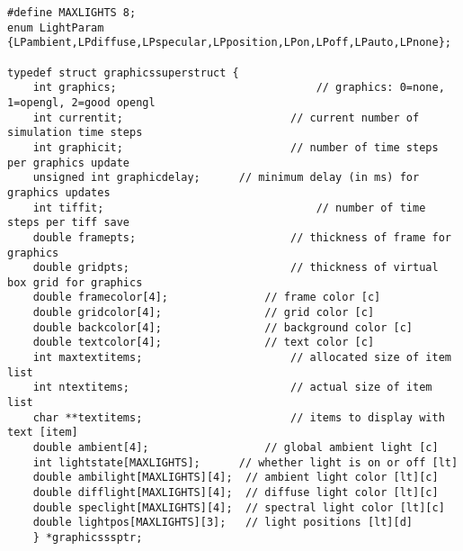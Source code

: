 \documentclass {book}
\begin{document}
\begin{lstlisting}
#define MAXLIGHTS 8;
enum LightParam {LPambient,LPdiffuse,LPspecular,LPposition,LPon,LPoff,LPauto,LPnone};

typedef struct graphicssuperstruct {
	int graphics;								// graphics: 0=none, 1=opengl, 2=good opengl
	int currentit;							// current number of simulation time steps
	int graphicit;							// number of time steps per graphics update
	unsigned int graphicdelay;		// minimum delay (in ms) for graphics updates
	int tiffit;									// number of time steps per tiff save
	double framepts;						// thickness of frame for graphics
	double gridpts;							// thickness of virtual box grid for graphics
	double framecolor[4];				// frame color [c]
	double gridcolor[4];				// grid color [c]
	double backcolor[4];				// background color [c]
	double textcolor[4];				// text color [c]
	int maxtextitems;						// allocated size of item list
	int ntextitems;							// actual size of item list
	char **textitems;						// items to display with text [item]
	double ambient[4];					// global ambient light [c]
	int lightstate[MAXLIGHTS];		// whether light is on or off [lt]
	double ambilight[MAXLIGHTS][4];	 // ambient light color [lt][c]
	double difflight[MAXLIGHTS][4];	 // diffuse light color [lt][c]
	double speclight[MAXLIGHTS][4];	 // spectral light color [lt][c]
	double lightpos[MAXLIGHTS][3];	 // light positions [lt][d]
	} *graphicsssptr;
\end{lstlisting}
\end{document}
